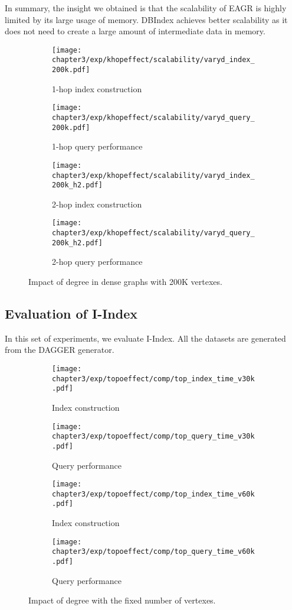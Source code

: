 In summary, the insight we obtained is that the scalability of EAGR 
is highly limited by its large usage of memory.
DBIndex achieves better scalability as it does not need to 
create a large amount of intermediate data in memory. 

\begin{figure}[h]
\centering
\begin{subfigure}{0.45\linewidth}
  \centering
  \texttt{[image: chapter3/exp/khopeffect/scalability/varyd\_index\_200k.pdf]}
  \caption{1-hop index construction}
\end{subfigure}
\begin{subfigure}{0.45\linewidth}
  \centering
  \texttt{[image: chapter3/exp/khopeffect/scalability/varyd\_query\_200k.pdf]}
  \caption{1-hop query performance}
\end{subfigure}
\begin{subfigure}{0.45\linewidth}
  \centering
  \texttt{[image: chapter3/exp/khopeffect/scalability/varyd\_index\_200k\_h2.pdf]}
  \caption{2-hop index construction}
\end{subfigure}
\begin{subfigure}{0.45\linewidth}
  \centering
  \texttt{[image: chapter3/exp/khopeffect/scalability/varyd\_query\_200k\_h2.pdf]}
  \caption{2-hop query performance }
\end{subfigure}
\caption{Impact of degree in dense graphs with 200K vertexes.}
\label{fig:khop_v200k}
\end{figure}

\subsection{Evaluation of I-Index}
In this set of experiments, we evaluate I-Index. 
All the datasets are generated from the DAGGER generator.   

\begin{figure}[h]
\centering
\begin{subfigure}{0.45\linewidth}
  \centering
  \texttt{[image: chapter3/exp/topoeffect/comp/top\_index\_time\_v30k.pdf]}
  \caption{Index construction}
\end{subfigure}
\begin{subfigure}{0.45\linewidth}
  \centering
  \texttt{[image: chapter3/exp/topoeffect/comp/top\_query\_time\_v30k.pdf]}
  \caption{Query performance}
\end{subfigure}
\begin{subfigure}{0.45\linewidth}
  \centering
  \texttt{[image: chapter3/exp/topoeffect/comp/top\_index\_time\_v60k.pdf]}
  \caption{Index construction}
\end{subfigure}
\begin{subfigure}{0.45\linewidth}
  \centering
  \texttt{[image: chapter3/exp/topoeffect/comp/top\_query\_time\_v60k.pdf]}
  \caption{Query performance}
\end{subfigure}
\caption{Impact of degree with the fixed number of vertexes.}
\label{fig:pi_effect}
\end{figure}

